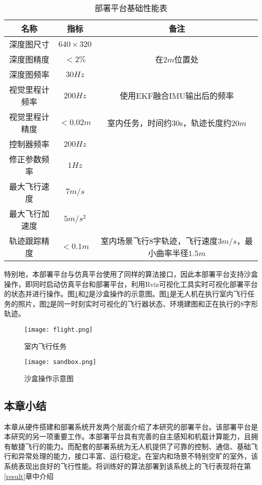 \begin{table}
    \centering
    \begin{tabular}{ccc}
    \hline
         名称 & 指标 & 备注 \\ \hline
        深度图尺寸 & $640\times 320$ & ~ \\ 
        深度图精度 & $<2\%$ & 在$2m$位置处 \\ 
        深度图频率 & $30Hz$ & ~ \\ 
        视觉里程计频率 & $200Hz$ & 使用EKF融合IMU输出后的频率 \\ 
        视觉里程计精度 & $<0.02m$ & 室内任务，时间约30s，轨迹长度约$20m$ \\ 
        控制器频率 & $200Hz$ & ~ \\ 
        修正参数频率 & $1Hz$ & ~ \\ 
        最大飞行速度 & $7m/s$ & ~ \\ 
        最大飞行加速度 & $5m/s^2$ & ~ \\ 
        轨迹跟踪精度 & $<0.1m$ & 室内场景飞行8字轨迹，飞行速度$3m/s$，最小曲率半径$1.5m$ \\ \hline
    \end{tabular}
    \caption{部署平台基础性能表}
    \label{tab_deploy}
\end{table}

特别地，本部署平台与仿真平台使用了同样的算法接口，因此本部署平台支持沙盒操作，即同时启动仿真平台和部署平台，利用Rviz可视化工具实时可视化部署平台的状态并进行操作。图\ref{fig_flight}和\ref{fig_sandbox}是沙盒操作的示意图。图\ref{fig_flight}是无人机在执行室内飞行任务的照片，图\ref{fig_sandbox}是同一时刻实时可视化的飞行器状态、环境建图和正在执行的8字形轨迹。
\begin{figure}
    \centering
    \texttt{[image: flight.png]}
    \caption{室内飞行任务}
    \label{fig_flight}
\end{figure}
\begin{figure}
    \centering
    \texttt{[image: sandbox.png]}
    \caption{沙盒操作示意图}
    \label{fig_sandbox}
\end{figure}

\subsection{本章小结}

本章从硬件搭建和部署系统开发两个层面介绍了本研究的部署平台。该部署平台是本研究的另一项重要工作。本部署平台具有完善的自主感知和机载计算能力，且拥有敏捷飞行的能力。而配套的部署系统为无人机提供了可靠的控制、通信、基础飞行和异常处理的能力，接口丰富、运行稳定。在室内和场景不特别空旷的室外，该系统表现出良好的飞行性能。将训练好的算法部署到该系统上的飞行表现将在第\ref{result}章中介绍

